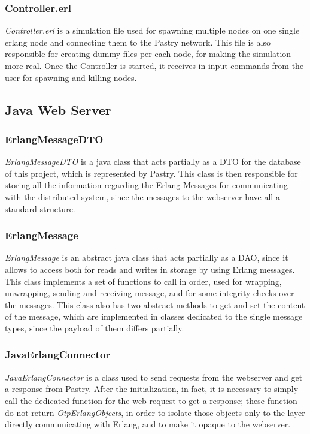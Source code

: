\documentclass{article}
\begin{document}
\subsubsection{Controller.erl}

\textit{Controller.erl} is a simulation file used for spawning multiple nodes on one single erlang node and connecting them to the Pastry network.
This file is also responsible for creating dummy files per each node, for making the simulation more real.
Once the Controller is started, it receives in input commands from the user for spawning and killing nodes.

\subsection{Java Web Server}

\subsubsection{ErlangMessageDTO}

\textit{ErlangMessageDTO} is a java class that acts partially as a DTO for the database of this project, which is represented by Pastry.
This class is then responsible for storing all the information regarding the Erlang Messages for communicating with the distributed system, 
since the messages to the webserver have all a standard structure.

\subsubsection{ErlangMessage}

\textit{ErlangMessage} is an abstract java class that acts partially as a DAO, since it allows to access both for reads and writes in storage by using 
Erlang messages. This class implements a set of functions to call in order, used for wrapping, unwrapping, sending and receiving message, and 
for some integrity checks over the messages. This class also has two abstract methods to get and set the content of the message, which are implemented in 
classes dedicated to the single message types, since the payload of them differs partially.

\subsubsection{JavaErlangConnector}

\textit{JavaErlangConnector} is a class used to send requests from the webserver and get a response from Pastry.
After the initialization, in fact, it is necessary to simply call the dedicated function for the web request to get a 
response; these function do not return \textit{OtpErlangObjects}, in order to isolate those objects only to the layer 
directly communicating with Erlang, and to make it opaque to the webserver.
\end{document}
